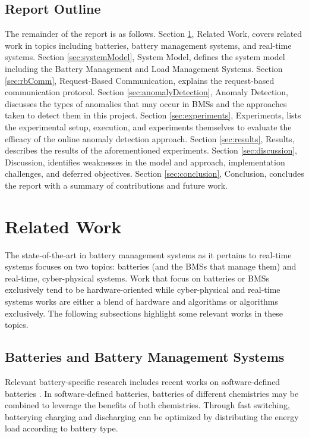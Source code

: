 \documentclass[11pt,conference,draftcls,onecolumn]{IEEEtran}
\begin{document}
\subsection{Report Outline}
The remainder of the report is as follows.
Section \ref{sec:relatedWork}, Related Work, covers related work in topics including batteries, battery management systems, and real-time systems.
Section \ref{sec:systemModel}, System Model, defines the system model including the Battery Management and Load Management Systems.
Section \ref{sec:rbComm}, Request-Based Communication, explains the request-based communication protocol.
Section \ref{sec:anomalyDetection}, Anomaly Detection, discusses the types of anomalies that may occur in BMSs and the approaches taken to detect them in this project.
Section \ref{sec:experiments}, Experiments, lists the experimental setup, execution, and experiments themselves to evaluate the efficacy of the online anomaly detection approach.
Section \ref{sec:results}, Results, describes the results of the aforementioned experiments.
Section \ref{sec:discussion}, Discussion, identifies weaknesses in the model and approach, implementation challenges, and deferred objectives.
Section \ref{sec:conclusion}, Conclusion, concludes the report with a summary of contributions and future work. 

\section{Related Work}\label{sec:relatedWork}
The state-of-the-art in battery management systems as it pertains to real-time systems focuses on two topics: batteries (and the BMSs that manage them) and real-time, cyber-physical systems.
Work that focus on batteries or BMSs exclusively tend to be hardware-oriented while cyber-physical and real-time systems works are either a blend of hardware and algorithms or algorithms exclusively.
The following subsections highlight some relevant works in these topics.

\subsection{Batteries and Battery Management Systems}
Relevant battery-specific research includes recent works on software-defined batteries \cite{softwareDefinedBatteriesConf,softwareDefinedBatteriesJrnl}.
In software-defined batteries, batteries of different chemistries may be combined to leverage the benefits of both chemistries.
Through fast switching, batterying charging and discharging can be optimized by distributing the energy load according to battery type.
\end{document}

